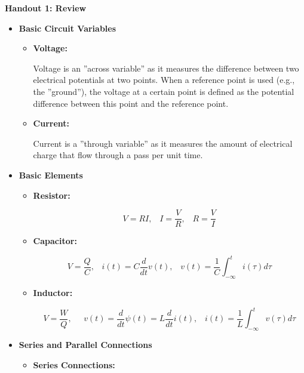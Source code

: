 \usepackage{html}
\textwidth 6.0in
\topmargin -0.5in
\oddsidemargin -0in
\evensidemargin -0.5in


\begin{center}
{\huge {\bf Handout 1: Review} }
\end{center}

\begin{itemize}

\item {\bf Basic Circuit Variables}
  \begin{itemize}
    \item {\bf Voltage:}

      Voltage is an ''across variable'' as it measures the difference between two electrical
      potentials at two points. When a reference point is used (e.g., the ''ground''), the
      voltage at a certain point is defined as the potential difference between this point
      and the reference point.

    \item {\bf Current:}

      Current is a ''through variable'' as it measures the amount of electrical charge that
      flow through a pass per unit time.

  \end{itemize}


\item {\bf Basic Elements}

  \begin{itemize}
  \item {\bf Resistor:}

    \[ V=RI,\;\;\;I=\frac{V}{R},\;\;\;R=\frac{V}{I} \]

  \item {\bf Capacitor:}

    \[ V=\frac{Q}{C}, \;\;\;i(t)=C\frac{d}{dt} v(t),\;\;\;
    v(t)=\frac{1}{C}\int_{-\infty}^t i(\tau) d\tau \]

  \item {\bf Inductor:}

    \[ V=\frac{W}{Q},\;\;\;\;\;v(t)=\frac{d}{dt} \psi(t)=L\frac{d}{dt} i(t),\;\;\;
    i(t)=\frac{1}{L}\int_{-\infty}^t v(\tau) d\tau \]

  \end{itemize}

\item {\bf Series and Parallel Connections}

  \begin{itemize}
  \item {\bf Series Connections:}


\end{itemize}
\end{itemize}
